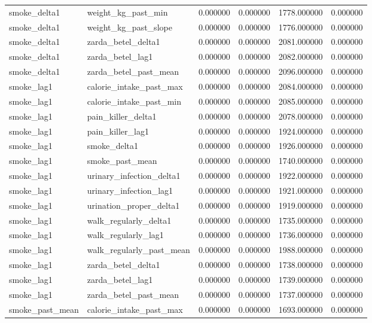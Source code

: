 \begin{longtable}{llrrrr}
smoke\_delta1 & weight\_kg\_past\_min & 0.000000 & 0.000000 & 1778.000000 & 0.000000 \\
smoke\_delta1 & weight\_kg\_past\_slope & 0.000000 & 0.000000 & 1776.000000 & 0.000000 \\
smoke\_delta1 & zarda\_betel\_delta1 & 0.000000 & 0.000000 & 2081.000000 & 0.000000 \\
smoke\_delta1 & zarda\_betel\_lag1 & 0.000000 & 0.000000 & 2082.000000 & 0.000000 \\
smoke\_delta1 & zarda\_betel\_past\_mean & 0.000000 & 0.000000 & 2096.000000 & 0.000000 \\
smoke\_lag1 & calorie\_intake\_past\_max & 0.000000 & 0.000000 & 2084.000000 & 0.000000 \\
smoke\_lag1 & calorie\_intake\_past\_min & 0.000000 & 0.000000 & 2085.000000 & 0.000000 \\
smoke\_lag1 & pain\_killer\_delta1 & 0.000000 & 0.000000 & 2078.000000 & 0.000000 \\
smoke\_lag1 & pain\_killer\_lag1 & 0.000000 & 0.000000 & 1924.000000 & 0.000000 \\
smoke\_lag1 & smoke\_delta1 & 0.000000 & 0.000000 & 1926.000000 & 0.000000 \\
smoke\_lag1 & smoke\_past\_mean & 0.000000 & 0.000000 & 1740.000000 & 0.000000 \\
smoke\_lag1 & urinary\_infection\_delta1 & 0.000000 & 0.000000 & 1922.000000 & 0.000000 \\
smoke\_lag1 & urinary\_infection\_lag1 & 0.000000 & 0.000000 & 1921.000000 & 0.000000 \\
smoke\_lag1 & urination\_proper\_delta1 & 0.000000 & 0.000000 & 1919.000000 & 0.000000 \\
smoke\_lag1 & walk\_regularly\_delta1 & 0.000000 & 0.000000 & 1735.000000 & 0.000000 \\
smoke\_lag1 & walk\_regularly\_lag1 & 0.000000 & 0.000000 & 1736.000000 & 0.000000 \\
smoke\_lag1 & walk\_regularly\_past\_mean & 0.000000 & 0.000000 & 1988.000000 & 0.000000 \\
smoke\_lag1 & zarda\_betel\_delta1 & 0.000000 & 0.000000 & 1738.000000 & 0.000000 \\
smoke\_lag1 & zarda\_betel\_lag1 & 0.000000 & 0.000000 & 1739.000000 & 0.000000 \\
smoke\_lag1 & zarda\_betel\_past\_mean & 0.000000 & 0.000000 & 1737.000000 & 0.000000 \\
smoke\_past\_mean & calorie\_intake\_past\_max & 0.000000 & 0.000000 & 1693.000000 & 0.000000 \\

\end{longtable}
